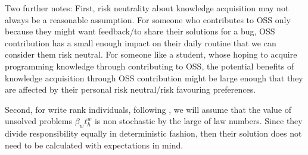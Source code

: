 \documentclass[source/paper/main.tex]{subfiles}
\begin{document}
Two further notes: First, risk neutrality about knowledge acquisition may not always be a reasonable assumption. For someone who contributes to OSS only because they might want feedback/to share their solutions for a bug, OSS contribution has a small enough impact on their daily routine that we can consider them risk neutral. For someone like a student, whose hoping to acquire programming knowledge through contributing to OSS, the potential benefits of knowledge acquisition through OSS contribution might be large enough that they are affected by their personal risk neutral/risk favouring preferences. 

Second, for write rank individuals, following \cite{garicano_hierarchies_2000}, we will assume that the value of unsolved problems $\beta_w t_h^w$ is non stochastic by the large of law numbers. Since they divide responsibility equally in deterministic fashion, then their solution does not need to be calculated with expectations in mind. 
\end{document}

